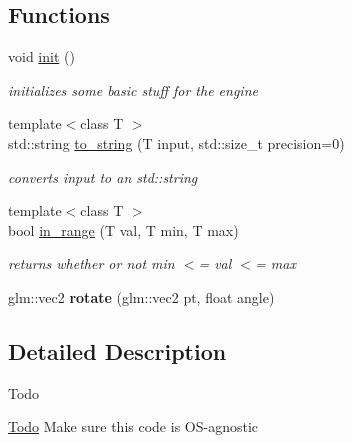 \subsection*{Functions}
\begin{DoxyCompactItemize}
\item 
\mbox{\label{namespacenta_a416e1430bb187e7a122f2729f96b1e58}} 
void \hyperlink{namespacenta_a416e1430bb187e7a122f2729f96b1e58}{init} ()
\begin{DoxyCompactList}\small\item\em initializes some basic stuff for the engine \end{DoxyCompactList}\item 
\mbox{\label{namespacenta_a7521a21e7957d0b80c6c54eb2a80d63d}} 
{\footnotesize template$<$class T $>$ }\\std\+::string \hyperlink{namespacenta_a7521a21e7957d0b80c6c54eb2a80d63d}{to\+\_\+string} (T input, std\+::size\+\_\+t precision=0)
\begin{DoxyCompactList}\small\item\em converts input to an std\+::string \end{DoxyCompactList}\item 
\mbox{\label{namespacenta_a5c6b09bba75d5132dad154b02fee6727}} 
{\footnotesize template$<$class T $>$ }\\bool \hyperlink{namespacenta_a5c6b09bba75d5132dad154b02fee6727}{in\+\_\+range} (T val, T min, T max)
\begin{DoxyCompactList}\small\item\em returns whether or not min $<$= val $<$= max \end{DoxyCompactList}\item 
\mbox{\label{namespacenta_ab887822a37815ec02164a8489966ac22}} 
glm\+::vec2 {\bfseries rotate} (glm\+::vec2 pt, float angle)
\end{DoxyCompactItemize}


\subsection{Detailed Description}
\begin{DoxyRefDesc}{Todo}
\item[\hyperlink{todo__todo000002}{Todo}]Make sure this code is O\+S-\/agnostic \end{DoxyRefDesc}


